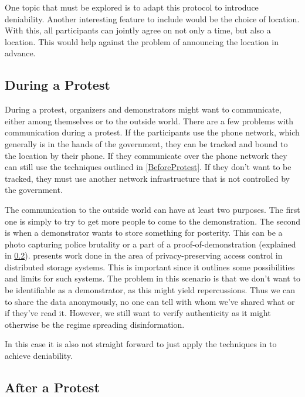 \documentclass[a4paper]{llncs}
\begin{document}
One topic that must be explored is to adapt this protocol to introduce 
deniability.
Another interesting feature to include would be the choice of location.
With this, all participants can jointly agree on not only a time, but also 
a location.
This would help against the problem of announcing the location in advance.

\subsection{During a Protest}
\label{DuringProtest}

During a protest, organizers and demonstrators might want to communicate, 
either among themselves or to the outside world.
There are a few problems with communication during a protest.
If the participants use the phone network, which generally is in the hands of 
the government, they can be tracked and bound to the location by their phone.
If they communicate over the phone network they can still use the techniques 
outlined in \cref{BeforeProtest}.
If they don't want to be tracked, they must use another network infrastructure 
that is not controlled by the government.

The communication to the outside world can have at least two purposes.
The first one is simply to try to get more people to come to the demonstration.
The second is when a demonstrator wants to store something for posterity.
This can be a photo capturing police brutality or a part of 
a proof-of-demonstration (explained in \cref{AfterProtest}).
\citet{DistStorAccessControl} presents work done in the area of 
privacy-preserving access control in distributed storage systems.
This is important since it outlines some possibilities and limits for such 
systems.
The problem in this scenario is that we don't want to be identifiable as 
a demonstrator, as this might yield repercussions.
Thus we can to share the data anonymously, no one can tell with whom we've 
shared what or if they've read it.
However, we still want to verify authenticity as it might otherwise be the 
regime spreading disinformation.

In this case it is also not straight forward to just apply the techniques in 
\cite{OTPKX} to achieve deniability.

\subsection{After a Protest}
\label{AfterProtest}
\end{document}
